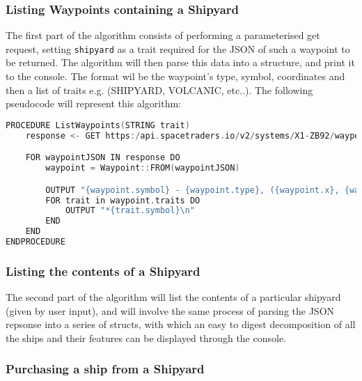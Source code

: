 \subsubsection{Listing Waypoints containing a Shipyard}
The first part of the algorithm consists of performing a parameterised get request, setting \texttt{shipyard} as a trait required for the JSON of such a waypoint to be returned. The algorithm will then parse this data into a structure, and print it to the console. The format wil be the waypoint's type, symbol, coordinates and then a list of traits e.g. (SHIPYARD, VOLCANIC, etc..). The following pseudocode will represent this algorithm:
\begin{lstlisting}[language=C]
PROCEDURE ListWaypoints(STRING trait)
    response <- GET https:/api.spacetraders.io/v2/systems/X1-ZB92/waypoints?traits={trait}

    FOR waypointJSON IN response DO 
        waypoint = Waypoint::FROM(waypointJSON)

        OUTPUT "{waypoint.symbol} - {waypoint.type}, ({waypoint.x}, {waypoint.y}):" 
        FOR trait in waypoint.traits DO
            OUTPUT "*{trait.symbol}\n"
        END
    END
ENDPROCEDURE
\end{lstlisting}
\subsubsection{Listing the contents of a Shipyard}
The second part of the algorithm will list the contents of a particular shipyard (given by user input), and will involve the same process of parsing the JSON repsonse into a series of structs, with which an easy to digest decomposition of all the ships and their features can be displayed through the console.
\subsubsection{Purchasing a ship from a Shipyard}